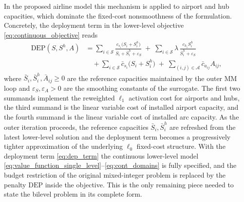 In the proposed airline model this mechanism is applied to airport and hub capacities, which dominate the fixed-cost nonsmoothness of the formulation. Concretely, the deployment term in the lower-level objective \eqref{eq:continuous_objective} reads
\begin{align}
\mathrm{DEP}(S,S^h,A)
&=
\sum_{i\in\mathcal{S}}\frac{c_{s_i}\bigl(S_i+S_i^h\bigr)}{\bar S_i+\bar S_i^h+\varepsilon_S}
\;+\;\sum_{i\in\mathcal{S}}\lambda\,\frac{c_{h_i}S_i^h}{\bar S_i^h+\varepsilon_S}
\nonumber\\
&\quad+\sum_{i\in\mathcal{S}}\bar c_{s_i}\bigl(S_i+S_i^h\bigr)
\;+\;\sum_{(i,j)\in\mathcal{A}}\bar c_{a_{ij}}A_{ij},
\label{eq:dep_term}
\end{align}
where $\bar S_i,\bar S_i^h,\bar A_{ij}\ge 0$ are the reference capacities maintained by the outer MM loop and $\varepsilon_S,\varepsilon_A>0$ are the smoothing constants of the surrogate. The first two summands implement the reweighted $\ell_1$ activation cost for airports and hubs, the third summand is the linear variable cost of installed airport capacity, and the fourth summand is the linear variable cost of installed arc capacity. As the outer iteration proceeds, the reference capacities $\bar S_i,\bar S_i^h$ are refreshed from the latest lower-level solution and the deployment term becomes a progressively tighter approximation of the underlying $\ell_0$ fixed-cost structure. With the deployment term \eqref{eq:dep_term} the continuous lower-level model \eqref{eq:value_function_single_level}--\eqref{eq:cont_domains} is fully specified, and the budget restriction of the original mixed-integer problem is replaced by the penalty $\mathrm{DEP}$ inside the objective. This is the only remaining piece needed to state the bilevel problem in its complete form.

